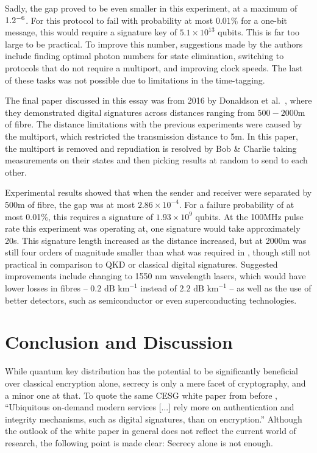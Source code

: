 \documentclass[%
 reprint,
 amsmath,amssymb,
 aps,
 pra,
]{revtex4-1}
\begin{document}
Sadly, the gap proved to be even smaller in this experiment, at a maximum of $1.2 \time 10^{-6}$. For this protocol to fail with probability at most $0.01\%$ for a one-bit message, this would require a signature key of $5.1 \times 10^{13}$ qubits. This is far too large to be practical. To improve this number, suggestions made by the authors include finding optimal photon numbers for state elimination, switching to protocols that do not require a multiport, and improving clock speeds. The last of these tasks was not possible due to limitations in the time-tagging.

The final paper discussed in this essay was from 2016 by Donaldson et al.\ \cite{PhysRevA.93.012329}, where they demonstrated digital signatures across distances ranging from $500-2000\text{m}$ of fibre. The distance limitations with the previous experiments were caused by the multiport, which restricted the transmission distance to 5m. In this paper, the multiport is removed and repudiation is resolved by Bob \& Charlie taking measurements on their states and then picking results at random to send to each other.

Experimental results showed that when the sender and receiver were separated by 500m of fibre, the gap was at most $2.86 \times 10^{-4}$. For a failure probability of at most 0.01\%, this requires a signature of $1.93 \times 10^{9}$ qubits. At the 100MHz pulse rate this experiment was operating at, one signature would take approximately 20s. This signature length increased as the distance increased, but at 2000m was still four orders of magnitude smaller than what was required in \cite{PhysRevLett.113.040502}, though still not practical in comparison to QKD or classical digital signatures. Suggested improvements include changing to 1550 nm wavelength lasers, which would have lower losses in fibres -- $0.2\text{ dB km}^{-1}$ instead of $2.2\text{ dB km}^{-1}$ -- as well as the use of better detectors, such as semiconductor \cite{0957-0233-21-1-012002} or even superconducting \cite{0953-2048-25-6-063001} technologies.

\section{Conclusion and Discussion}
\label{sec:conclusion}

While quantum key distribution has the potential to be significantly beneficial over classical encryption alone, secrecy is only a mere facet of cryptography, and a minor one at that. To quote the same CESG white paper from before \cite{CESG16}, ``Ubiquitous on-demand modern services [...] rely more on authentication and integrity mechanisms, such as digital signatures, than on encryption.'' Although the outlook of the white paper in general does not reflect the current world of research, the following point is made clear: Secrecy alone is not enough.
\end{document}
